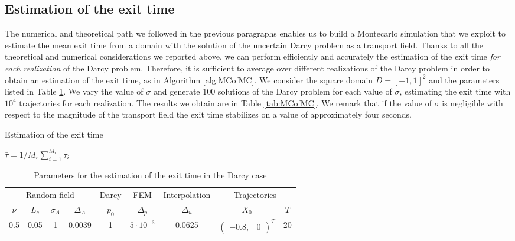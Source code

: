 \subsection{Estimation of the exit time}

The numerical and theoretical path we followed in the previous paragraphs enables us to build a Montecarlo simulation that we exploit to estimate the mean exit time from a domain with the solution of the uncertain Darcy problem as a transport field. Thanks to all the theoretical and numerical considerations we reported above, we can perform efficiently and accurately the estimation of the exit time \textit{for each realization} of the Darcy problem. Therefore, it is sufficient to average over different realizations of the Darcy problem in order to obtain an estimation of the exit time, as in Algorithm \ref{alg:MCofMC}. We consider the square domain $D = [-1, 1]^2$ and the parameters listed in Table \ref{tab:MCPar}. We vary the value of $\sigma$ and generate 100 solutions of the Darcy problem for each value of $\sigma$, estimating the exit time with $10^4$ trajectories for each realization. The results we obtain are in Table \ref{tab:MCofMC}. We remark that if the value of $\sigma$ is negligible with respect to the magnitude of the transport field the exit time stabilizes on a value of approximately four seconds.

\begin{algorithm}[t]
\caption{Estimation of the exit time}
$\bar \tau = 1/M_r \sum_{i = 1}^{M_r} \tau_i$ \;
\label{alg:MCofMC}
\end{algorithm}

\begin{table}[H]
\centering
\begin{tabular}{ccccccccc}
\toprule
\multicolumn{4}{c}{Random field} & \multicolumn{1}{c}{Darcy} & \multicolumn{1}{c}{FEM} & \multicolumn{1}{c}{Interpolation} & \multicolumn{2}{c}{Trajectories} \\ 
\cmidrule{1-4} \cmidrule{8-9}
$\nu$    & $L_c$ & $\sigma_A$ & $\Delta_A$ & $p_0$ & $\Delta_p$ & $\Delta_u$ & $X_0$ & $T$ \\
\midrule
0.5 & 0.05 & 1 & 0.0039 & 1 & $5\cdot 10^{-3}$ & 0.0625 & $\begin{pmatrix} -0.8, & 0 \end{pmatrix}^T$ & 20\\
\bottomrule
\end{tabular}
\caption{Parameters for the estimation of the exit time in the Darcy case}
\label{tab:MCPar}
\end{table}

